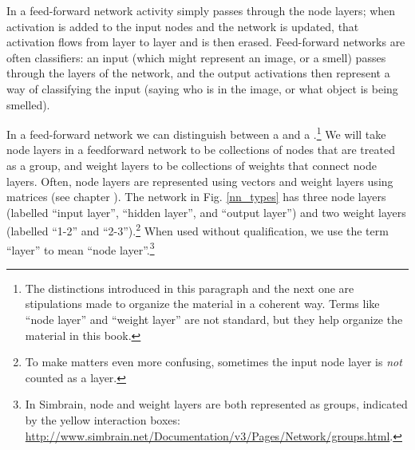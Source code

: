  In a feed-forward network activity simply passes through the node layers; when activation is added to the input nodes and the network is updated, that activation flows from layer to layer and is then erased. Feed-forward networks are often classifiers: an input (which might represent an image, or a smell) passes through the layers of the network, and the output activations then represent a way of classifying the input (saying who is in the image, or what object is being smelled).

In a feed-forward network we can distinguish between a  and a .\footnote{The distinctions introduced in this paragraph and the next one are stipulations made to organize the material in a coherent way. Terms like ``node layer'' and ``weight layer'' are not standard, but they help organize the material in this book.} We will take node layers in a feedforward network to be collections of nodes that are treated as a group, and weight layers to be collections of weights that connect node layers. Often, node layers are represented using vectors and weight layers using matrices (see chapter ). The network in Fig. \ref{nn_types} has three node layers (labelled ``input layer'', ``hidden layer'', and ``output layer'') and two weight layers (labelled ``1-2'' and ``2-3'').\footnote{To make matters even more confusing, sometimes the input node layer is \emph{not} counted as a layer.} When used without qualification, we use the term ``layer'' to mean ``node layer''.\footnote{In Simbrain, node and weight layers are both represented as groups, indicated by the yellow interaction boxes: \url{http://www.simbrain.net/Documentation/v3/Pages/Network/groups.html}.}

